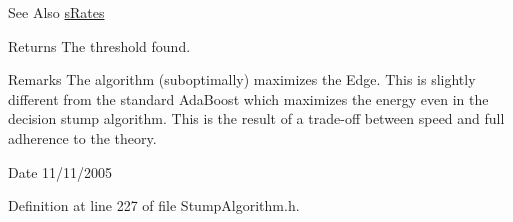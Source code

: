 \begin{DoxySeeAlso}{See Also}
\hyperlink{structMultiBoost_1_1sRates}{s\-Rates} 
\end{DoxySeeAlso}
\begin{DoxyReturn}{Returns}
The threshold found. 
\end{DoxyReturn}
\begin{DoxyRemark}{Remarks}
The algorithm (suboptimally) maximizes the Edge. This is slightly different from the standard Ada\-Boost which maximizes the energy even in the decision stump algorithm. This is the result of a trade-\/off between speed and full adherence to the theory. 
\end{DoxyRemark}
\begin{DoxyDate}{Date}
11/11/2005 
\end{DoxyDate}


Definition at line 227 of file Stump\-Algorithm.\-h.

